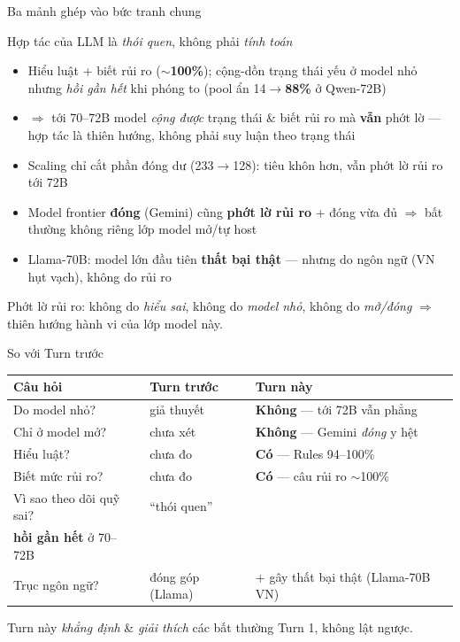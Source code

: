 \documentclass[aspectratio=169,10pt]{beamer}
\newcommand{\good}[1]{\textcolor{green!45!black}{\textbf{#1}}}   %
\newcommand{\weak}[1]{\textcolor{red!70!black}{\textbf{#1}}}     %
\newcommand{\take}[1]{\vfill{\footnotesize\textcolor{green!45!black}{#1}}}
\begin{document}
\begin{frame}{Ba mảnh ghép vào bức tranh chung}
  \begin{block}{Hợp tác của LLM là \emph{thói quen}, không phải \emph{tính toán}}
    \begin{itemize}\setlength\itemsep{3pt}
      \item Hiểu luật + biết rủi ro (\good{$\sim$100\%}); cộng-dồn trạng thái yếu ở model nhỏ nhưng \emph{hồi gần hết} khi phóng to (pool ẩn 14$\to$\good{88\%} ở Qwen-72B)
      \item $\Rightarrow$ tới 70--72B model \emph{cộng được} trạng thái \& biết rủi ro mà \good{vẫn} phớt lờ --- hợp tác là thiên hướng, không phải suy luận theo trạng thái
      \item Scaling chỉ cắt phần đóng dư (233$\to$128): tiêu khôn hơn, vẫn phớt lờ rủi ro tới 72B
      \item Model frontier \textbf{đóng} (Gemini) cũng \good{phớt lờ rủi ro} + đóng vừa đủ $\Rightarrow$ bất thường không riêng lớp model mở/tự host
      \item Llama-70B: model lớn đầu tiên \weak{thất bại thật} --- nhưng do \alert{ngôn ngữ} (VN hụt vạch), không do rủi ro
    \end{itemize}
  \end{block}
  \take{Phớt lờ rủi ro: không do \emph{hiểu sai}, không do \emph{model nhỏ}, không do \emph{mở/đóng} $\Rightarrow$ \alert{thiên hướng hành vi} của lớp model này.}
\end{frame}

\begin{frame}{So với Turn trước}
  \centering
  \setlength{\tabcolsep}{11pt}\renewcommand{\arraystretch}{1.35}
  \begin{tabular}{lll}
    \toprule
    Câu hỏi & Turn trước & Turn này \\
    \midrule
    Do model nhỏ?        & giả thuyết & \weak{Không} --- tới 72B vẫn phẳng \\
    Chỉ ở model mở?      & chưa xét   & \weak{Không} --- Gemini \emph{đóng} y hệt \\
    Hiểu luật?           & chưa đo    & \good{Có} --- Rules 94--100\% \\
    Biết mức rủi ro?     & chưa đo    & \good{Có} --- câu rủi ro $\sim$100\% \\
    Vì sao theo dõi quỹ sai? & ``thói quen'' & \makecell[l]{\weak{Cộng dồn yếu} ở nhỏ,\\\good{hồi gần hết} ở 70--72B} \\
    Trục ngôn ngữ?       & đóng góp (Llama) & + \alert{gây thất bại thật} (Llama-70B VN) \\
    \bottomrule
  \end{tabular}
  \take{Turn này \emph{khẳng định} \& \emph{giải thích} các bất thường Turn 1, không lật ngược.}
\end{frame}
\end{document}
